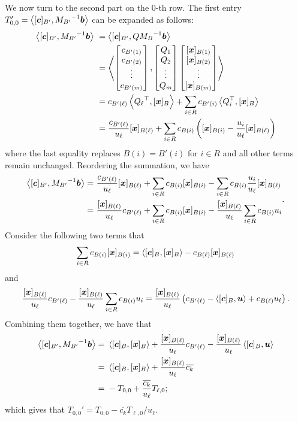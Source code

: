 We now turn to the second part on the 0-th row. The first entry $T'_{0,0} = \left\langle[{\boldsymbol c}]_{B'}, {M_{B'}}^{-1} {\boldsymbol b}\right\rangle$ can be expanded as follows:
\[ \begin{split}  
\inner{[\bmc]_{B'}, {M_{B'}}^{-1} \bmb}~& = \inner{[\bmc]_{B'}, Q{M_B}^{-1} \bmb}\\
& = \inner{
\bmat{ c_{B'(1)} \\ c_{B'(2)} \\ \vdots\\ c_{B'(m)}},  
\bmat{Q_1\\ Q_2\\\vdots\\ Q_m}
\bmat{[\bmx]_{B(1)} \\ [\bmx]_{B(2)}\\ \vdots \\ [\bmx]_{B(m)}}
}\\
& = c_{B'(\ell)} \inner{{Q_\ell}^\top, [\bmx]_B} + \sum_{i \in R} c_{B'(i)} \inner{Q_i^\top, [\bmx]_B} \\ 
& = \frac{ c_{B'(\ell)} }{u_\ell} [\bmx]_{B(\ell)} + \sum_{i \in R}c_{B(i)} \left([\bmx]_{B(i)} - \frac{u_i}{u_\ell} [\bmx]_{B(\ell)}\right) \\
\end{split} \]
where the last equality replaces $B(i) = B'(i)$ for $i\in R$ and all other terms remain unchanged. Reordering the summation, we have 
\[ \begin{split} \left\langle[{\boldsymbol c}]_{B'}, {M_{B'}}^{-1} {\boldsymbol b}\right\rangle = ~&
\frac{ c_{B'(\ell)} }{u_\ell} [{\boldsymbol x}]_{B(\ell)} + \sum_{i \in R}c_{B(i)} [{\boldsymbol x}]_{B(i)} - \sum_{i \in R}c_{B(i)}\frac{u_i}{u_\ell} [{\boldsymbol x}]_{B(\ell)} \\
=~& \frac{[{\boldsymbol x}]_{B(\ell)} }{u_\ell} c_{B'(\ell)}  + \sum_{i \in R}c_{B(i)} [{\boldsymbol x}]_{B(i)} - \frac{[{\boldsymbol x}]_{B(\ell)}}{u_\ell}\sum_{i \in R}c_{B(i)}u_i  \end{split}. \]
Consider the following two terms that 
\[  \sum_{i \in R}c_{B(i)} [{\boldsymbol x}]_{B(i)} = \left\langle[{\boldsymbol c}]_B, [{\boldsymbol x}]_B\right\rangle - c_{B(\ell)} [{\boldsymbol x}]_{B(\ell)} \]
and
\[ \frac{[{\boldsymbol x}]_{B(\ell)} }{u_\ell} c_{B'(\ell)}  - \frac{[{\boldsymbol x}]_{B(\ell)}}{u_\ell}\sum_{i \in R}c_{B(i)}u_i  =  \frac{[\boldsymbol{x}]_{B(\ell)}}{u_\ell} \left( c_{B'(\ell)} - \left\langle[\boldsymbol{c}]_B, {\boldsymbol u}\right\rangle + c_{B(\ell)} u_\ell \right).  \]
Combining them together, we have that 
\[ \begin{split} \left\langle[{\boldsymbol c}]_{B'}, {M_{B'}}^{-1} {\boldsymbol b}\right\rangle =~& \left\langle[{\boldsymbol c}]_B, [{\boldsymbol x}]_B\right\rangle  + \frac{[\boldsymbol{x}]_{B(\ell)}}{u_\ell} c_{B'(\ell)} -\frac{[\boldsymbol{x}]_{B(\ell)}}{u_\ell}  \left\langle[\boldsymbol{c}]_B, {\boldsymbol u}\right\rangle \\
=~& \left\langle[{\boldsymbol c}]_B, [{\boldsymbol x}]_B\right\rangle  + \frac{[\boldsymbol{x}]_{B(\ell)}}{u_\ell} \overline{c_k} \\
=~ & -T_{0, 0} + \frac{\overline{c_k}}{u_\ell}T_{\ell, 0}; 
\end{split} 
\]
which gives that $T_{0, 0}' = T_{0, 0} - \overline{c_k} T_{\ell, 0}/ u_\ell$. 



